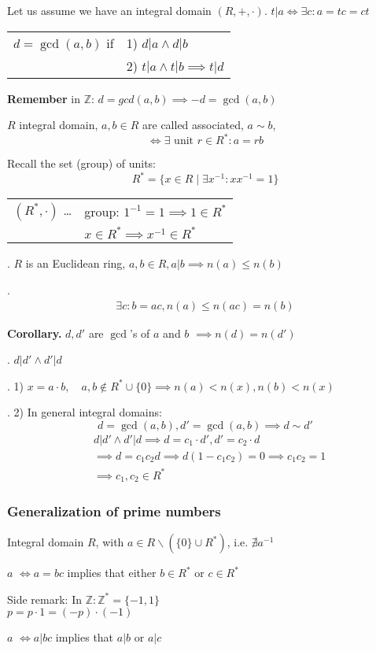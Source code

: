 Let us assume we have an integral domain $(R,+, \cdot)$.
$t|a \Leftrightarrow \exists c: a=tc =ct$
\begin{tabular}{ll}
$d=\gcd(a,b)$ if & 1) $d|a \land d|b$ \\
  & 2) $t|a \land t|b \implies t|d$
\end{tabular}

\textbf{Remember}
in $\mathbb{Z}$: $d = gcd(a,b) \implies -d = \gcd(a,b)$

\begin{definition}
$R$ integral domain,
$a,b \in R$ are called associated, $a \sim b$,
\[
  \Leftrightarrow \exists \text{ unit } r \in R^{*}: a = rb
\]
\end{definition}

Recall the set (group) of units:
\[
  R^{*} = \{ x \in R \mid \exists x^{-1} : xx^{-1} = 1\}
\]
\begin{tabular}{ll}
  $(R^{*}, \cdot)$ \ldots
    & group: $1^{-1} = 1 \implies 1 \in R^{*}$ \\
    & $x\in R^{*} \implies x^{-1} \in R^{*}$
\end{tabular}

\Theorem.
$R$ is an Euclidean ring, $a,b\in R, a|b \implies n(a) \leq n(b)$

\Proof.
\begin{align*}
  \exists c : b = ac, n(a) \leq n(ac) = n(b)
\end{align*}

\textbf{Corollary.}
$d, d'$ are $\gcd$'s of $a$ and $b$ $\implies n(d) = n(d')$

\Proof.
$d|d' \land d' | d$


\Remark.
1) $x = a\cdot b, \quad a,b\not\in R^{*} \cup \{0\} \implies n(a) < n(x), n(b) < n(x)$

\Remark.
2) In general integral domains:
\[
  d= \gcd(a,b), d' = \gcd(a,b) \implies d \sim d'
\]
\begin{align*}
  &d|d' \land d'|d \implies d = c_1\cdot d', d' = c_2 \cdot d \\
  &\implies d = c_1c_2 d \implies d (1-c_1c_2) = 0 \implies c_1 c_2 = 1\\
  &\implies c_1,c_2 \in R^{*}
\end{align*}

\subsubsection{Generalization of prime numbers}
\begin{definition}
  Integral domain $R$, with $a\in R \backslash (\{0\}\cup R^{*})$, i.e. $\nexists a^{-1}$

$a$  $\Leftrightarrow a = bc$ implies that either $b\in R^{*}$ or $c\in R^{*}$

Side remark:
In $\mathbb{Z}: \mathbb{Z}^{*} = \{-1, 1\}$ \\
$p = p \cdot 1 = (-p) \cdot (-1)$

$a$  $\Leftrightarrow a | bc$ implies that $a|b$ or $a|c$
\end{definition}

